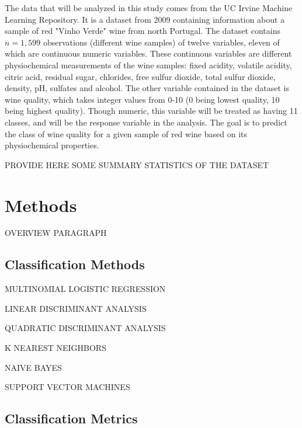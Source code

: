 \documentclass[12pt]{article}
\begin{document}
The data that will be analyzed in this study comes from the UC Irvine 
Machine Learning Repository.  It is a dataset from 2009 containing 
information about a sample of red "Vinho Verde" wine from north Portugal.  
The dataset contains $n=1,599$ observations (different wine samples) of 
twelve variables, eleven of which are continuous numeric variables.  
These continuous variables are different physiochemical measurements of 
the wine samples: fixed acidity, volatile acidity, citric acid, residual 
sugar, chlorides, free sulfur dioxide, total sulfur dioxide, density, 
pH, sulfates and alcohol.  The other variable contained in the dataset 
is wine quality, which takes integer values from 0-10 (0 being lowest 
quality, 10 being highest quality).  Though numeric, this variable will 
be treated as having 11 classes, and will be the response variable in 
the analysis.  The goal is to predict the class of wine quality for a 
given sample of red wine based on its physiochemical properties.  

PROVIDE HERE SOME SUMMARY STATISTICS OF THE DATASET


\section{Methods}
\label{sec:meth}

OVERVIEW PARAGRAPH

\subsection{Classification Methods}
\label{sec:class}

MULTINOMIAL LOGISTIC REGRESSION

LINEAR DISCRIMINANT ANALYSIS

QUADRATIC DISCRIMINANT ANALYSIS 

K NEAREST NEIGHBORS

NAIVE BAYES

SUPPORT VECTOR MACHINES

\subsection{Classification Metrics}
\label{sec:metr}
\end{document}
